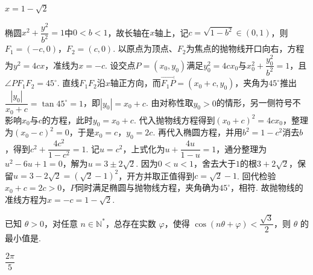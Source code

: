 \begin{answer}
\(x=1-\sqrt2\)
\end{answer}

\begin{solution}
椭圆\(x^2+\dfrac{y^2}{b^2}=1\)中\(0<b<1\)，故长轴在\(x\)轴上，记\(c=\sqrt{1-b^2}\in\left( 0,1 \right)\)，则\(F_1=\left( -c,0 \right)\)，\(F_2=\left( c,0 \right)\). 以原点为顶点、\(F_2\)为焦点的抛物线开口向右，方程为\(y^2=4cx\)，准线为\(x=-c\). 设交点\(P=\left( x_0,y_0 \right)\)满足\(y_0^2=4cx_0\)与\(x_0^2+\dfrac{y_0^2}{b^2}=1\)，且\(\angle PF_1F_2=45^\circ\). 直线\(F_1F_2\)沿\(x\)轴正方向，而\(\overrightarrow{F_1P}=\left( x_0+c,y_0 \right)\)，夹角为\(45^\circ\)推出\(\dfrac{\left| y_0 \right|}{x_0+c}=\tan 45^\circ=1\)，即\(\left| y_0 \right|=x_0+c\). 由对称性取\(y_0>0\)的情形，另一侧符号不影响\(x_0\)与\(c\)的方程，此时\(y_0=x_0+c\). 代入抛物线方程得到\(\left( x_0+c \right)^2=4cx_0\)，整理为\(\left( x_0-c \right)^2=0\)，于是\(x_0=c\)，\(y_0=2c\). 再代入椭圆方程，并用\(b^2=1-c^2\)消去\(b\)，得到\(c^2+\dfrac{4c^2}{1-c^2}=1\). 记\(u=c^2\)，上式化为\(u+\dfrac{4u}{1-u}=1\)，通分整理为\(u^2-6u+1=0\)，解为\(u=3\pm 2\sqrt{2}\). 因为\(0<u<1\)，舍去大于\(1\)的根\(3+2\sqrt{2}\)，保留\(u=3-2\sqrt{2}=\left( \sqrt{2}-1 \right)^2\)，开方并取正值得到\(c=\sqrt{2}-1\). 回代检验\(x_0+c=2c>0\)，\(P\)同时满足椭圆与抛物线方程，夹角确为\(45^\circ\)，相符. 故抛物线的准线方程为\(x=-c=1-\sqrt{2}\).
\end{solution}

\begin{problem}
已知 \(\theta>0\)，对任意 \(n\in\mathbb N^*\)，总存在实数 \(\varphi\)，使得 \(\cos(n\theta+\varphi)<\dfrac{\sqrt3}{2}\)，则 \(\theta\) 的最小值是\fillinblank{}.
\end{problem}

\begin{answer}
\(\dfrac{2\pi}{5}\)
\end{answer}

